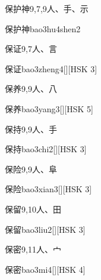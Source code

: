 \begin{entry}{保护神}{9,7,9}{⼈、⼿、⽰}
  \begin{phonetics}{保护神}{bao3hu4shen2}
  \end{phonetics}
\end{entry}

\begin{entry}{保证}{9,7}{⼈、⾔}
  \begin{phonetics}{保证}{bao3zheng4}[][HSK 3]
  \end{phonetics}
\end{entry}

\begin{entry}{保养}{9,9}{⼈、⼋}
  \begin{phonetics}{保养}{bao3yang3}[][HSK 5]
  \end{phonetics}
\end{entry}

\begin{entry}{保持}{9,9}{⼈、⼿}
  \begin{phonetics}{保持}{bao3chi2}[][HSK 3]
  \end{phonetics}
\end{entry}

\begin{entry}{保险}{9,9}{⼈、⾩}
  \begin{phonetics}{保险}{bao3xian3}[][HSK 3]
  \end{phonetics}
\end{entry}

\begin{entry}{保留}{9,10}{⼈、⽥}
  \begin{phonetics}{保留}{bao3liu2}[][HSK 3]
  \end{phonetics}
\end{entry}

\begin{entry}{保密}{9,11}{⼈、⼧}
  \begin{phonetics}{保密}{bao3mi4}[][HSK 4]
  \end{phonetics}
\end{entry}

